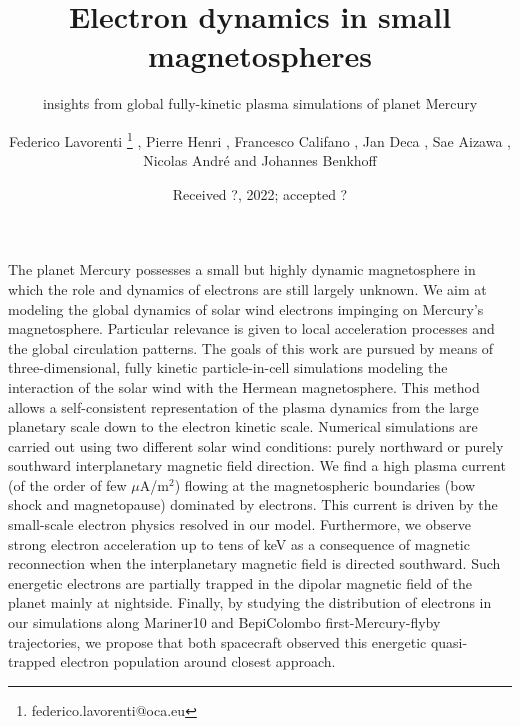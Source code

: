 \documentclass{aa}
\begin{document}
\title{Electron dynamics in small magnetospheres}
\subtitle{insights from global fully-kinetic plasma simulations of planet Mercury}

\author{ Federico Lavorenti
          \thanks{federico.lavorenti@oca.eu}
          ,
         Pierre Henri
          ,
         Francesco Califano
          ,
         Jan Deca
          ,
         Sae Aizawa
          ,
         Nicolas Andr\'e
          and
         Johannes Benkhoff
          }
          



 \date{Received ?, 2022; accepted ?}

\abstract
{The planet Mercury possesses a small but highly dynamic magnetosphere in which the role and dynamics of electrons are still largely unknown.}
{We aim at modeling the global dynamics of solar wind electrons impinging on Mercury's magnetosphere. Particular relevance is given to local acceleration processes and the global circulation patterns.}
{The goals of this work are pursued by means of three-dimensional, fully kinetic particle-in-cell simulations modeling the interaction of the solar wind with the Hermean magnetosphere. This method allows a self-consistent representation of the plasma dynamics from the large planetary scale down to the electron kinetic scale. Numerical simulations are carried out using two different solar wind conditions: purely northward or purely southward interplanetary magnetic field direction.}
{We find a high plasma current (of the order of few $\mu$A/m$^2$) flowing at the magnetospheric boundaries (bow shock and magnetopause) dominated by electrons. This current is driven by the small-scale electron physics resolved in our model.
Furthermore, we observe strong electron acceleration up to tens of keV as a consequence of magnetic reconnection when the interplanetary magnetic field is directed southward. Such energetic electrons are partially trapped in the dipolar magnetic field of the planet mainly at nightside. 
Finally, by studying the distribution of electrons in our simulations along Mariner10 and BepiColombo first-Mercury-flyby trajectories, we propose that both spacecraft observed this energetic quasi-trapped electron population around closest approach.}
{}
\end{document}
